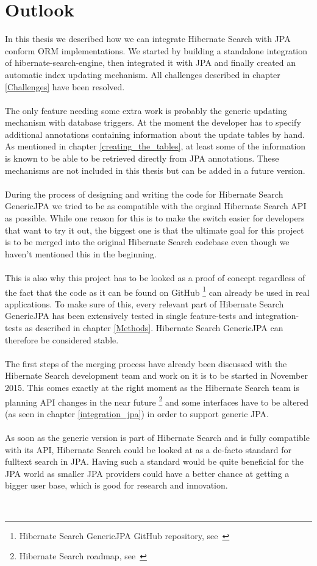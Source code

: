 
\section{Outlook}\label{outlook}

In this thesis we described how we can integrate Hibernate Search with JPA conform ORM implementations. We started by building a standalone integration of hibernate-search-engine, then integrated it with JPA and finally created an automatic index updating mechanism. All challenges described in chapter \ref{Challenges} have been resolved.
\\\\
The only feature needing some extra work is probably the generic updating mechanism with database triggers. At the moment the developer has to specify additional annotations containing information about the update tables by hand. As mentioned in chapter \ref{creating_the_tables}, at least some of the information is known to be able to be retrieved directly from JPA annotations. These mechanisms are not included in this thesis but can be added in a future version.
\\\\
During the process of designing and writing the code for Hibernate Search GenericJPA we tried to be as compatible with the orginal Hibernate Search API as possible. While one reason for this is to make the switch easier for developers that want to try it out, the biggest one is that the ultimate goal for this project is to be merged into the original Hibernate Search codebase even though we haven't mentioned this in the beginning.
\\\\
This is also why this project has to be looked as a proof of concept regardless of the fact that the code as it can be found on GitHub \footnote{Hibernate Search GenericJPA GitHub repository, see~\cite{hibernate_genericjpa_github}} can already be used in real applications. To make sure of this, every relevant part of Hibernate Search GenericJPA has been extensively tested in single feature-tests and integration-tests as described in chapter \ref{Methods}. Hibernate Search GenericJPA can therefore be considered stable. 
\\\\
The first steps of the merging process have already been discussed with the Hibernate Search development team and work on it is to be started in November 2015. This comes exactly at the right moment as the Hibernate Search team is planning API changes in the near future \footnote{Hibernate Search roadmap, see~\cite{hibernate_search_roadmap}} and some interfaces have to be altered (as seen in chapter \ref{integration_jpa}) in order to support generic JPA.
\\\\
As soon as the generic version is part of Hibernate Search and is fully compatible with its API, Hibernate Search could be looked at as a de-facto standard for fulltext search in JPA. Having such a standard would be quite beneficial for the JPA world as smaller JPA providers could have a better chance at getting a bigger user base, which is good for research and innovation.

\pagebreak
~